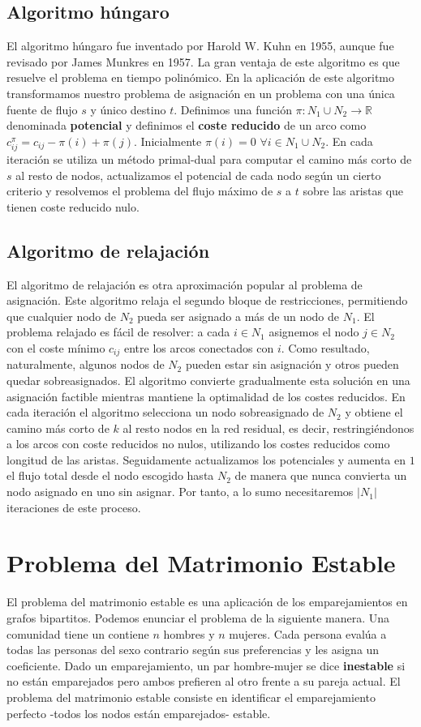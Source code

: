 \documentclass[twoside,12pt]{article}
\begin{document}
\subsection{Algoritmo húngaro}
El algoritmo húngaro fue inventado por Harold W. Kuhn en 1955, aunque fue revisado por James Munkres en 1957. La gran ventaja de este algoritmo es que resuelve el problema en tiempo polinómico. En la aplicación de este algoritmo transformamos nuestro problema de asignación en un problema con una única fuente de flujo $s$ y único destino $t$. Definimos una función $\pi : N_1\cup N_2 \to \mathbb{R}$ denominada \textbf{potencial} y definimos el \textbf{coste reducido} de un arco como $c_{ij}^\pi = c_{ij}-\pi(i)+\pi(j)$. Inicialmente $\pi(i) = 0$ $\forall i \in N_1\cup N_2$. En cada iteración se utiliza un método primal-dual para computar el camino más corto de $s$ al resto de nodos, actualizamos el potencial de cada nodo según un cierto criterio y resolvemos el problema del flujo máximo de $s$ a $t$ sobre las aristas que tienen coste reducido nulo. 

\subsection{Algoritmo de relajación}
El algoritmo de relajación es otra aproximación popular al problema de asignación. Este algoritmo relaja el segundo bloque de restricciones, permitiendo que cualquier nodo de $N_2$ pueda ser asignado a más de un nodo de $N_1$. El problema relajado es fácil de resolver: a cada $i\in N_1$ asignemos el nodo $j\in N_2$ con el coste mínimo $c_{ij}$ entre los arcos conectados con $i$. Como resultado, naturalmente, algunos nodos de $N_2$ pueden estar sin asignación y otros pueden quedar sobreasignados. El algoritmo convierte gradualmente esta solución en una asignación factible mientras mantiene la optimalidad de los costes reducidos. En cada iteración el algoritmo selecciona un nodo sobreasignado de $N_2$ y obtiene el camino más corto de $k$ al resto nodos en la red residual, es decir, restringiéndonos a los arcos con coste reducidos no nulos, utilizando los costes reducidos como longitud de las aristas. Seguidamente actualizamos los potenciales y aumenta en $1$ el flujo total desde el nodo escogido hasta $N_2$ de manera que nunca convierta un nodo asignado en uno sin asignar. Por tanto, a lo sumo necesitaremos $|N_1|$ iteraciones de este proceso.

\section{Problema del Matrimonio Estable}
El problema del matrimonio estable es una aplicación de los emparejamientos en grafos bipartitos. Podemos enunciar el problema de la siguiente manera. Una comunidad tiene un contiene $n$ hombres y $n$ mujeres. Cada persona evalúa a todas las personas del sexo contrario según sus preferencias y les asigna un coeficiente. Dado un emparejamiento, un par hombre-mujer se dice \textbf{inestable} si no están emparejados pero ambos prefieren al otro frente a su pareja actual. El problema del matrimonio estable consiste en identificar el emparejamiento perfecto -todos los nodos están emparejados- estable. 
\end{document}
